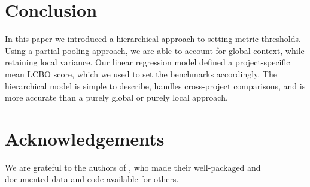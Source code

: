 \documentclass[sigconf,natbib=false]{acmart}
\begin{document}
\section{Conclusion}
In this paper we introduced a hierarchical approach to setting metric thresholds. Using a partial pooling approach, we are able to account for global context, while retaining local variance. Our linear regression model defined a project-specific mean LCBO score, which we used to set the benchmarks accordingly. The hierarchical model is simple to describe, handles cross-project comparisons, and is more accurate than a purely global or purely local approach.

\section{Acknowledgements}
We are grateful to the authors of \cite{Aniche2016}, who made their well-packaged and documented data and code available for others.
 
\newpage
 \printbibliography 
\end{document}
